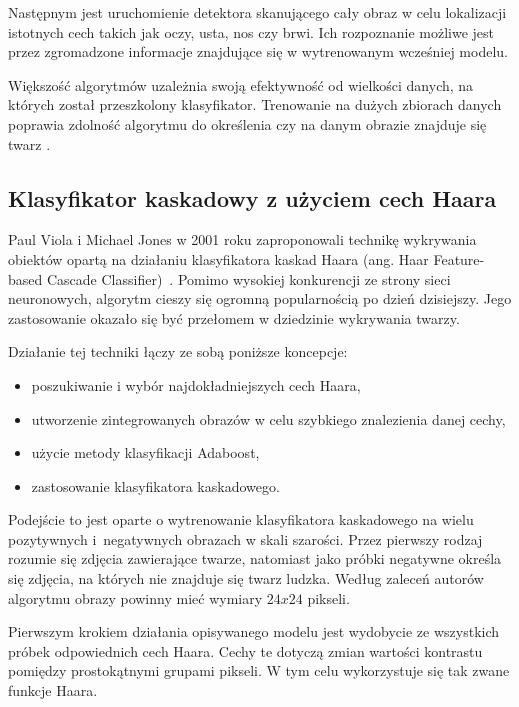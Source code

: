 Następnym jest uruchomienie detektora skanującego cały obraz w celu lokalizacji istotnych cech takich jak oczy, usta, nos czy brwi. Ich rozpoznanie możliwe jest przez zgromadzone informacje znajdujące się w wytrenowanym wcześniej modelu.

Większość algorytmów uzależnia swoją efektywność od wielkości danych, na których został przeszkolony klasyfikator. Trenowanie na dużych zbiorach danych poprawia zdolność algorytmu do określenia czy na danym obrazie znajduje się twarz \cite{fDetection}.


\subsection{Klasyfikator kaskadowy z użyciem cech Haara}
\label{sub:Haar}
Paul Viola i Michael Jones w 2001 roku zaproponowali technikę wykrywania obiektów opartą na działaniu klasyfikatora kaskad Haara (ang. Haar Feature-based Cascade Classifier)~\cite{haar}. Pomimo wysokiej konkurencji ze strony sieci neuronowych, algorytm cieszy się ogromną popularnością po dzień dzisiejszy. Jego zastosowanie okazało się być przełomem w dziedzinie wykrywania twarzy. 

Działanie tej techniki łączy ze sobą poniższe koncepcje:
\begin{itemize}
    \item poszukiwanie i wybór najdokładniejszych cech Haara,
    \item utworzenie zintegrowanych obrazów w celu szybkiego znalezienia danej cechy,
    \item użycie metody klasyfikacji Adaboost,
    \item zastosowanie klasyfikatora kaskadowego.
\end{itemize}

Podejście to jest oparte o wytrenowanie klasyfikatora kaskadowego na wielu pozytywnych i~negatywnych obrazach w skali szarości. Przez pierwszy rodzaj rozumie się zdjęcia zawierające twarze, natomiast jako próbki negatywne określa się zdjęcia, na których nie znajduje się twarz ludzka. Według zaleceń autorów algorytmu obrazy powinny mieć wymiary $24x24$ pikseli.

Pierwszym krokiem działania opisywanego modelu jest wydobycie ze wszystkich próbek odpowiednich cech Haara. Cechy te dotyczą zmian wartości kontrastu pomiędzy prostokątnymi grupami pikseli. W tym celu wykorzystuje się tak zwane funkcje Haara.

